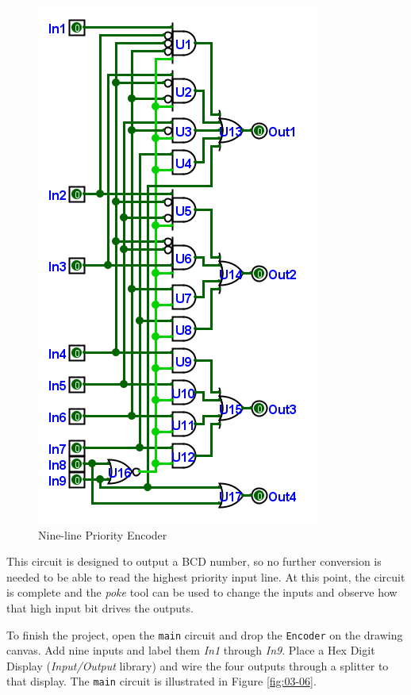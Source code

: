 \begin{figure}[H]
	\centering
	\includegraphics[width=\maxwidth{.95\linewidth}]{gfx/03-05}
	\caption{Nine-line Priority Encoder}
	\label{fig:03-05}
\end{figure}

This circuit is designed to output a \acf{BCD} number, so no further conversion is needed to be able to read the highest priority input line. At this point, the circuit is complete and the \textit{poke} tool can be used to change the inputs and observe how that high input bit drives the outputs.

To finish the project, open the \lstinline[columns=fixed]|main| circuit and drop the \lstinline[columns=fixed]|Encoder| on the drawing canvas. Add nine inputs and label them \textit{In1} through \textit{In9}. Place a Hex Digit Display (\textit{Input/Output} library) and wire the four outputs through a splitter to that display. The \lstinline[columns=fixed]|main| circuit is illustrated in Figure \ref{fig:03-06}.

